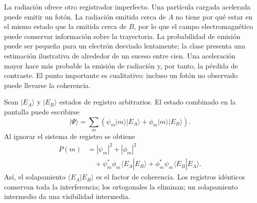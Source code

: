 La radiación ofrece otro registrador imperfecto. Una partícula cargada acelerada puede emitir un fotón. La radiación emitida cerca de \(A\) no tiene por qué estar en el mismo estado que la emitida cerca de \(B\), por lo que el campo electromagnético puede conservar información sobre la trayectoria. La probabilidad de emisión puede ser pequeña para un electrón desviado lentamente; la clase presenta una estimación ilustrativa de alrededor de un suceso entre cien. Una aceleración mayor hace más probable la emisión de radiación y, por tanto, la pérdida de contraste. El punto importante es cualitativo: incluso un fotón no observado puede llevarse la coherencia.

\begin{classroomqa}
\end{classroomqa}

\begin{classroomqa}
\end{classroomqa}

Sean \(|E_A\rangle\) y \(|E_B\rangle\) estados de registro arbitrarios. El estado combinado en la pantalla puede escribirse
\begin{equation}
|\Psi\rangle
=\sum_m\left(
\psi_m|m\rangle|E_A\rangle
+\phi_m|m\rangle|E_B\rangle
\right).
\end{equation}
Al ignorar el sistema de registro se obtiene
\begin{align}
P(m)
&=|\psi_m|^2+|\phi_m|^2 \\
&\quad
+\psi_m^*\phi_m\langle E_A|E_B\rangle
+\phi_m^*\psi_m\langle E_B|E_A\rangle.
\end{align}
Así, el solapamiento \(\langle E_A|E_B\rangle\) es el factor de coherencia. Los registros idénticos conservan toda la interferencia; los ortogonales la eliminan; un solapamiento intermedio da una visibilidad intermedia.

